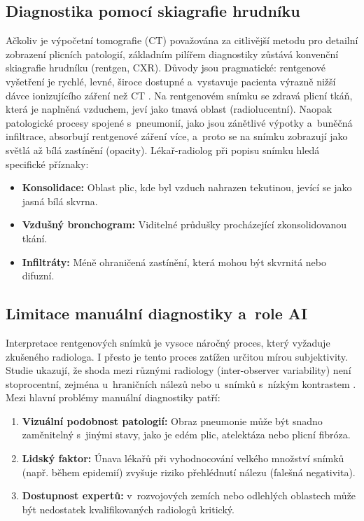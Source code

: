 \documentclass[12pt, a4paper]{report}
\begin{document}
\subsection{Diagnostika pomocí skiagrafie hrudníku}
Ačkoliv je výpočetní tomografie (CT) považována za citlivější metodu pro detailní zobrazení plicních patologií, základním pilířem diagnostiky zůstává konvenční skiagrafie hrudníku (rentgen, CXR).
Důvody jsou pragmatické: rentgenové vyšetření je rychlé, levné, široce dostupné a~vystavuje pacienta výrazně nižší dávce ionizujícího záření než CT \cite{chest_xray_diagnosis}.
Na rentgenovém snímku se zdravá plicní tkáň, která je naplněná vzduchem, jeví jako tmavá oblast (radiolucentní).
Naopak patologické procesy spojené s~pneumonií, jako jsou zánětlivé výpotky a~buněčná infiltrace, absorbují rentgenové záření více, a~proto se na snímku zobrazují jako světlá až bílá zastínění (opacity).
Lékař-radiolog při popisu snímku hledá specifické příznaky:
\begin{itemize}
    \item \textbf{Konsolidace:} Oblast plic, kde byl vzduch nahrazen tekutinou, jevící se jako jasná bílá skvrna.
    \item \textbf{Vzdušný bronchogram:} Viditelné průdušky procházející zkonsolidovanou tkání.
    \item \textbf{Infiltráty:} Méně ohraničená zastínění, která mohou být skvrnitá nebo difuzní.
\end{itemize}

\subsection{Limitace manuální diagnostiky a~role AI}
Interpretace rentgenových snímků je vysoce náročný proces, který vyžaduje zkušeného radiologa.
I přesto je tento proces zatížen určitou mírou subjektivity. Studie ukazují, že shoda mezi různými radiology (inter-observer variability) není stoprocentní, zejména u~hraničních nálezů nebo u~snímků s~nízkým kontrastem \cite{radiologist_error_rate}.
Mezi hlavní problémy manuální diagnostiky patří:
\begin{enumerate}
    \item \textbf{Vizuální podobnost patologií:} Obraz pneumonie může být snadno zaměnitelný s~jinými stavy, jako je edém plic, atelektáza nebo plicní fibróza.
    \item \textbf{Lidský faktor:} Únava lékařů při vyhodnocování velkého množství snímků (např. během epidemií) zvyšuje riziko přehlédnutí nálezu (falešná negativita).
    \item \textbf{Dostupnost expertů:} v~rozvojových zemích nebo odlehlých oblastech může být nedostatek kvalifikovaných radiologů kritický.
\end{enumerate}
\end{document}
